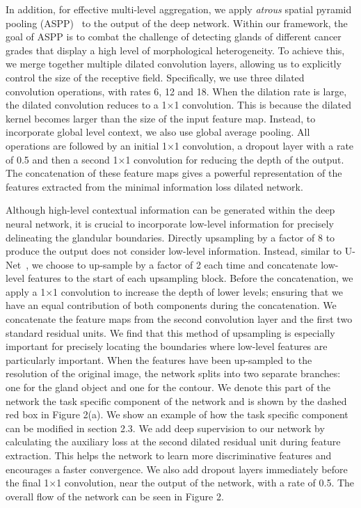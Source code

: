 \documentclass[3p]{elsarticle}
\begin{document}
In addition, for effective multi-level aggregation, we apply \textit{atrous} spatial pyramid pooling (ASPP)~\citep{chen2018deeplab} to the output of the deep network. Within our framework, the goal of ASPP is to combat the challenge of detecting glands of different cancer grades that display a high level of morphological heterogeneity. To achieve this, we merge together multiple dilated convolution layers, allowing us to explicitly control the size of the receptive field. Specifically, we use three dilated convolution operations, with rates 6, 12 and 18. When the dilation rate is large, the dilated convolution reduces to a 1$\times$1 convolution. This is because the dilated kernel becomes larger than the size of the input feature map. Instead, to incorporate global level context, we also use global average pooling. All operations are followed by an initial 1$\times$1 convolution, a dropout layer with a rate of 0.5 and then a second 1$\times$1 convolution for reducing the depth of the output. The concatenation of these feature maps gives a powerful representation of the features extracted from the minimal information loss dilated network.

Although high-level contextual information can be generated within the deep neural network, it is crucial to incorporate low-level information for precisely delineating the glandular boundaries. Directly upsampling by a factor of 8 to produce the output does not consider low-level information. Instead, similar to U-Net~\citep{ronneberger2015u}, we choose to up-sample by a factor of 2 each time and concatenate low-level features to the start of each upsampling block. Before the concatenation, we apply a 1$\times$1 convolution to increase the depth of lower levels; ensuring that we have an equal contribution of both components during the concatenation. We concatenate the feature maps from the second convolution layer and the first two standard residual units. We find that this method of upsampling is especially important for precisely locating the boundaries where low-level features are particularly important. When the features have been up-sampled to the resolution of the original image, the network splits into two separate branches: one for the gland object and one for the contour. We denote this part of the network the task specific component of the network and is shown by the dashed red box in Figure 2(a). We show an example of how the task specific component can be modified in section 2.3. We add deep supervision to our network by calculating the auxiliary loss at the second dilated residual unit during feature extraction. This helps the network to learn more discriminative features and encourages a faster convergence. We also add dropout layers immediately before the final 1$\times$1 convolution, near the output of the network, with a rate of 0.5. The overall flow of the network can be seen in Figure 2. 
\end{document}
